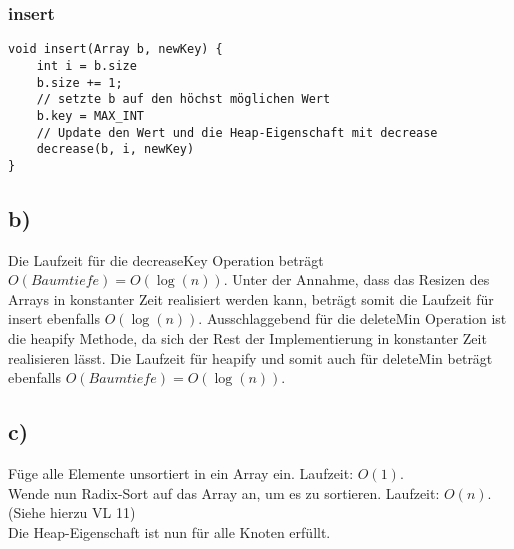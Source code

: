 \documentclass[a4paper,11pt,twoside]{scrartcl}
\begin{document}
\subsubsection*{insert}
\begin{lstlisting}[style=c,basicstyle=\small\ttfamily]
void insert(Array b, newKey) {
	int i = b.size
	b.size += 1;
	// setzte b auf den höchst möglichen Wert
	b.key = MAX_INT 
	// Update den Wert und die Heap-Eigenschaft mit decrease
	decrease(b, i, newKey)
}
\end{lstlisting}


\subsection*{b)}
Die Laufzeit für die decreaseKey Operation beträgt $O(Baumtiefe) = O(\log(n))$. Unter der Annahme, dass das Resizen des Arrays in konstanter Zeit realisiert werden kann, beträgt somit die Laufzeit für insert ebenfalls $O(\log(n))$. Ausschlaggebend für die deleteMin Operation ist die heapify Methode, da sich der Rest der Implementierung in konstanter Zeit realisieren lässt. Die Laufzeit für heapify und somit auch für deleteMin beträgt ebenfalls $O(Baumtiefe) = O(\log(n))$.

\subsection*{c)}
Füge alle Elemente unsortiert in ein Array ein. Laufzeit: $O(1)$.\\
Wende nun Radix-Sort auf das Array an, um es zu sortieren. Laufzeit: $O(n)$. (Siehe hierzu VL 11)\\
Die Heap-Eigenschaft ist nun für alle Knoten erfüllt.
\end{document}
